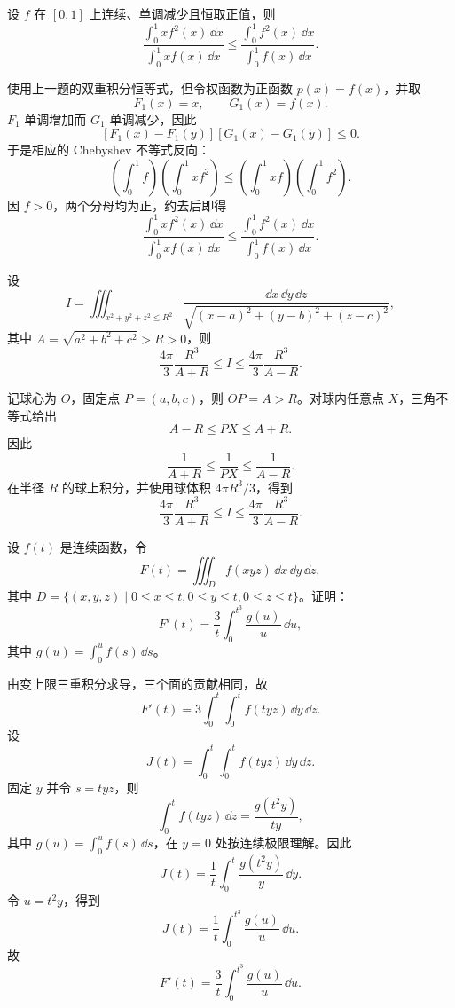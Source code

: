\begin{xreferenceproblem}[12]
设 $f$ 在 $[0,1]$ 上连续、单调减少且恒取正值，则
  \[
    \frac{\int_0^1xf^2(x)\,\dd x}{\int_0^1xf(x)\,\dd x}
    \le\frac{\int_0^1f^2(x)\,\dd x}{\int_0^1f(x)\,\dd x}.
  \]
\end{xreferenceproblem}
\begin{xsolution}
使用上一题的双重积分恒等式，但令权函数为正函数 $p(x)=f(x)$，并取
\[
  F_1(x)=x,
  \qquad G_1(x)=f(x).
\]
$F_1$ 单调增加而 $G_1$ 单调减少，因此
\[
 [F_1(x)-F_1(y)][G_1(x)-G_1(y)]\le0.
\]
于是相应的 Chebyshev 不等式反向：
\[
 \left(\int_0^1f\right)
 \left(\int_0^1x f^2\right)
 \le
 \left(\int_0^1x f\right)
 \left(\int_0^1 f^2\right).
\]
因 $f>0$，两个分母均为正，约去后即得
\[
  \boxed{
  \frac{\int_0^1x f^2(x)\,\dd x}{\int_0^1x f(x)\,\dd x}
  \le
  \frac{\int_0^1f^2(x)\,\dd x}{\int_0^1f(x)\,\dd x}}.
\]
\end{xsolution}


\begin{xreferenceproblem}[13]
设
  \[
    I=\iiint_{x^2+y^2+z^2\le R^2}\frac{\dd x\,\dd y\,\dd z}{\sqrt{(x-a)^2+(y-b)^2+(z-c)^2}},
  \]
  其中 $A=\sqrt{a^2+b^2+c^2}>R>0$，则
  \[
    \frac{4\pi}{3}\frac{R^3}{A+R}\le I\le\frac{4\pi}{3}\frac{R^3}{A-R}.
  \]
\end{xreferenceproblem}
\begin{xsolution}
记球心为 $O$，固定点 $P=(a,b,c)$，则 $OP=A>R$。对球内任意点 $X$，三角不等式给出
\[
  A-R\le PX\le A+R.
\]
因此
\[
  \frac1{A+R}\le\frac1{PX}\le\frac1{A-R}.
\]
在半径 $R$ 的球上积分，并使用球体积 $4\pi R^3/3$，得到
\[
  \boxed{
  \frac{4\pi}{3}\frac{R^3}{A+R}
  \le I\le
  \frac{4\pi}{3}\frac{R^3}{A-R}}.
\]
\end{xsolution}


\begin{xreferenceproblem}[14]
设 $f(t)$ 是连续函数，令
  \[
    F(t)=\iiint_D f(xyz)\,\dd x\,\dd y\,\dd z,
  \]
  其中 $D=\{(x,y,z)\mid0\le x\le t,0\le y\le t,0\le z\le t\}$。证明：
  \[
    F'(t)=\frac3t\int_0^{t^3}\frac{g(u)}u\,\dd u,
  \]
  其中 $g(u)=\int_0^u f(s)\,\dd s$。
\end{xreferenceproblem}
\begin{xsolution}
由变上限三重积分求导，三个面的贡献相同，故
\[
  F'(t)=3\int_0^t\int_0^t f(tyz)\,\dd y\,\dd z.
\]
设
\[
  J(t)=\int_0^t\int_0^t f(tyz)\,\dd y\,\dd z.
\]
固定 $y$ 并令 $s=tyz$，则
\[
  \int_0^tf(tyz)\,\dd z
  =\frac{g(t^2y)}{ty},
\]
其中 $g(u)=\int_0^uf(s)\,\dd s$，在 $y=0$ 处按连续极限理解。因此
\[
  J(t)=\frac1t\int_0^t\frac{g(t^2y)}y\,\dd y.
\]
令 $u=t^2y$，得到
\[
  J(t)=\frac1t\int_0^{t^3}\frac{g(u)}u\,\dd u.
\]
故
\[
  \boxed{F'(t)=\frac3t\int_0^{t^3}\frac{g(u)}u\,\dd u}.
\]
\end{xsolution}


